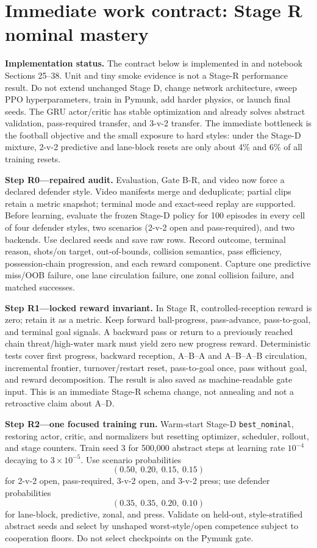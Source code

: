 \documentclass[12pt,twocolumn]{article}
\begin{document}
\section{Immediate work contract: Stage R nominal mastery}
\textbf{Implementation status.} The contract below is implemented in
 and notebook Sections 25--38. Unit and tiny smoke evidence is
not a Stage-R performance result. Do not extend unchanged Stage D, change network
architecture, sweep PPO hyperparameters, train in Pymunk, add harder physics, or launch final
seeds. The GRU actor/critic has stable optimization and already solves abstract validation,
pass-required transfer, and 3-v-2 transfer. The immediate bottleneck is the football objective
and the small exposure to hard styles: under the Stage-D mixture, 2-v-2 predictive and lane-block
resets are only about 4\% and 6\% of all training resets.

\textbf{Step R0---repaired audit.} Evaluation, Gate B-R, and video now force a declared defender
style. Video manifests merge and deduplicate; partial clips retain a metric snapshot; terminal
mode and exact-seed replay are supported. Before learning, evaluate the frozen Stage-D policy for 100
episodes in every cell of four defender styles, two scenarios (2-v-2 open and pass-required), and
two backends. Use declared seeds and save raw rows. Record outcome, terminal reason, shots/on
target, out-of-bounds, collision semantics, pass efficiency, possession-chain progression, and
each reward component. Capture one predictive miss/OOB failure, one lane circulation failure, one
zonal collision failure, and matched successes.

\textbf{Step R1---locked reward invariant.} In Stage R, controlled-reception reward is zero;
retain it as a metric. Keep forward ball-progress, pass-advance, pass-to-goal, and terminal goal
signals. A backward pass or return to a previously reached chain threat/high-water mark must yield
zero new progress reward. Deterministic tests cover first progress, backward reception, A--B--A
and A--B--A--B circulation, incremental frontier, turnover/restart reset, pass-to-goal once, pass
without goal, and reward decomposition. The result is also saved as machine-readable gate input.
This is an immediate Stage-R schema change, not annealing and not a retroactive claim about A--D.

\textbf{Step R2---one focused training run.} Warm-start Stage-D \texttt{best\_nominal}, restoring
actor, critic, and normalizers but resetting optimizer, scheduler, rollout, and stage counters.
Train seed 3 for 500,000 abstract steps at learning rate $10^{-4}$ decaying to
$3\times10^{-5}$. Use scenario probabilities
\[
(0.50,\ 0.20,\ 0.15,\ 0.15)
\]
for 2-v-2 open, pass-required, 3-v-2 open, and 3-v-2 press; use defender probabilities
\[
(0.35,\ 0.35,\ 0.20,\ 0.10)
\]
for lane-block, predictive, zonal, and press. Validate on held-out, style-stratified abstract
seeds and select by unshaped worst-style/open competence subject to cooperation floors. Do not
select checkpoints on the Pymunk gate.
\end{document}
